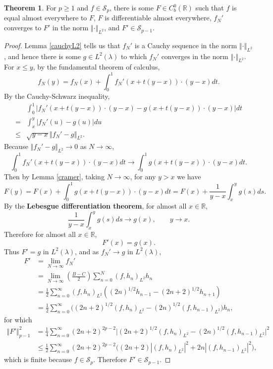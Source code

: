 \documentclass{article}
\newcommand{\norm}[1]{\left\Vert #1 \right\Vert}
\theoremstyle{definition}
\newtheorem{theorem}{Theorem}
\theoremstyle{definition}
\begin{document}
\begin{theorem}
For $p \geq 1$ and $f \in \mathscr{S}_p$,
there is some $F \in C_b^0(\mathbb{R})$
such that $f$ is equal almost everywhere to $F$, 
$F$ is differentiable almost everywhere,
$f_N'$ converges to $F'$ in the norm
$\norm{\cdot}_{L^2}$, and    
 $F' \in \mathscr{S}_{p-1}$. 
\end{theorem}
\begin{proof}
Lemma \ref{cauchyL2} tells us that $f_N'$ is a Cauchy sequence in the norm $\norm{\cdot}_{L^2}$, and
hence there is some $g \in L^2(\lambda)$ to which $f_N'$ converges in
 the norm $\norm{\cdot}_{L^2}$. 
For $x \leq y$, by the fundamental theorem of calculus,
\[
f_N(y) = f_N(x) + \int_0^1 f_N'(x+t(y-x))\cdot (y-x) dt.
\]
By the Cauchy-Schwarz inequality,
\[
\begin{split}
&\int_0^1|f_N'(x+t(y-x))\cdot (y-x)-g(x+t(y-x))\cdot (y-x)| dt\\
=&\int_x^y |f_N'(u)-g(u)| du\\
\leq&\sqrt{y-x} \norm{f_N'-g}_{L^2}.
\end{split}
\]
Because $\norm{f_N'-g}_{L^2} \to 0$ as $N \to \infty$,
\[
\int_0^1f_N'(x+t(y-x))\cdot (y-x) dt
\to \int_0^1 g(x+t(y-x))\cdot (y-x) dt.
\]
Then by Lemma \ref{cramer}, taking $N \to \infty$, for any $y>x$ we have
\[
F(y)=F(x)+\int_0^1 g(x+t(y-x))\cdot (y-x) dt = F(x) + \frac{1}{y-x} \int_x^y g(s) ds.
\]
By the \textbf{Lebesgue differentiation theorem},
for almost all $x \in \mathbb{R}$,
\[
\frac{1}{y-x} \int_x^y g(s) ds \to g(x),\qquad y \to x.
\]
Therefore for almost all $x \in \mathbb{R}$,
\[
F'(x) = g(x).
\]
Thus $F'=g$ in $L^2(\lambda)$,
and as $f_N' \to g$ in $L^2(\lambda)$,
\begin{align*}
F' &= \lim_{N \to \infty} f_N' \\
&= \lim_{N \to \infty} \left(\frac{B-C}{2}\right)
\sum_{n=0}^N (f,h_n)_{L^2} h_n\\
&= \frac{1}{2}\sum_{n=0}^\infty  (f,h_n)_{L^2} ((2n)^{1/2}h_{n-1}-(2n+2)^{1/2}h_{n+1})\\
&= \frac{1}{2}\sum_{n=0}^\infty \bigg( (2n+2)^{1/2} (f,h_n)_{L^2}-(2n)^{1/2} (f,h_{n-1})_{L^2}\bigg) h_n,
\end{align*}
for which
\begin{align*}
\norm{F'}_{p-1}^2&=\frac{1}{4} \sum_{n=0}^\infty (2n+2)^{2p-2} \bigg| (2n+2)^{1/2} (f,h_n)_{L^2}-(2n)^{1/2} (f,h_{n-1})_{L^2}\bigg|^2\\
&\leq \frac{1}{2} \sum_{n=0}^\infty (2n+2)^{2p-2}\bigg((2n+2) |(f,h_n)_{L^2}|^2+2n |(f,h_{n-1})_{L^2}|^2\bigg),
\end{align*}
which is finite because $f \in \mathscr{S}_p$. Therefore $F' \in \mathscr{S}_{p-1}$. 
\end{proof}
\end{document}
